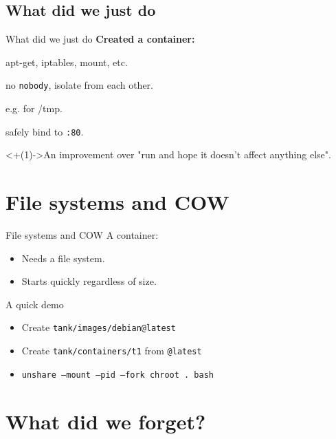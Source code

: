 \documentclass[14pt]{beamer}
\begin{document}
\subsection{What did we just do}
\begin{frame}{What did we just do}
    \relax
    {\bf Created a container:}
    \begin{description}[<+(1)->]
        \item[User namespace] apt-get, iptables, mount, etc.
        \item[Isolated pids] no {\tt nobody}, isolate from each other.
        \item[Isolated mounts] e.g. for /tmp.
        \item[Isolated network] safely bind to {\tt :80}.
    \end{description}
    \onslide<+(1)->{An improvement over "run and hope it doesn't affect anything else".}
\end{frame}

\section{File systems and COW}
\begin{frame}{File systems and COW}
    A container:
    \begin{itemize}[<+->]
        \item Needs a file system.
        \item Starts quickly regardless of size.
    \end{itemize}



\end{frame}

\begin{frame}{A quick demo}
    \small
    \begin{itemize}
        \item Create {\tt tank/images/debian@latest}
        \item Create {\tt tank/containers/t1} from {\tt @latest}
        \item {\tt unshare --mount --pid --fork chroot . bash}
    \end{itemize}
\end{frame}

\section{What did we forget?}
\end{document}
